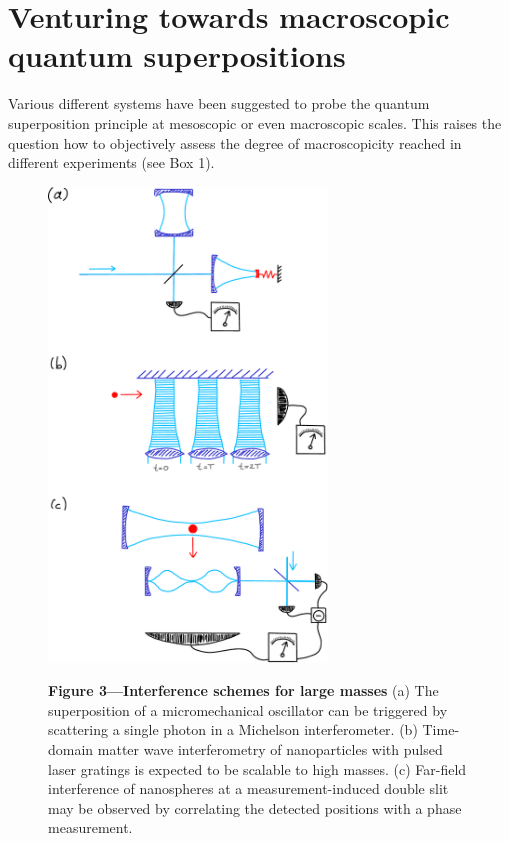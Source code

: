 \documentclass[11pt]{article}
\begin{document}
\section{Venturing towards macroscopic quantum superpositions }

Various different systems have been suggested to probe the quantum superposition principle at mesoscopic or even macroscopic scales.
This raises the question how to objectively assess the degree of macroscopicity reached in different experiments\cite{Nimmrichter2013} (see Box 1).


\begin{figure}
\centerline{
\includegraphics[width=0.66\textwidth]{Fig3-sketch.pdf}}
\small
{\bfseries\sffamily Figure 3---Interference schemes for large masses}
(a) The superposition of a micromechanical oscillator can be triggered by scattering a single photon in a Michelson interferometer.
(b) Time-domain matter wave interferometry  of nanoparticles with pulsed laser gratings is expected to be scalable to high masses.
(c) Far-field interference of nanospheres at a measurement-induced double slit may be observed by correlating the detected positions with a phase measurement. 
\end{figure} 
\end{document}
